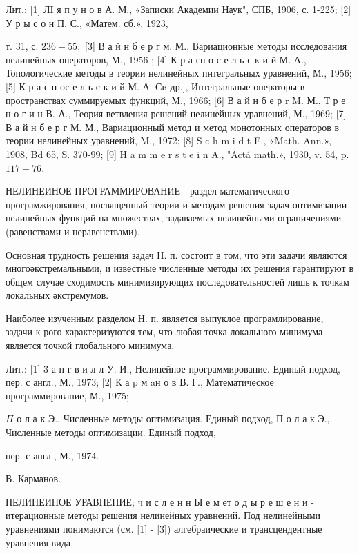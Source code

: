 \documentclass[10pt]{article}
\begin{document}
Лит.: [1] ЛI я п у н о в А. М., «Записки Академии Наук", СПБ, 1906, с. 1-225; [2] У р ы с о н П. С., «Матем. сб.», 1923,

т. 31, с. $236-55 ;$ [3] В а й н б е р г м. М., Вариационные методы исследования нелинейных операторов, М., 1956 ; [4] К р а сн о с е л ь с к и й М. А., Топологические методы в теории нелинейных пнтегральных уравнений, М., 1956; [5] К р а с н ос е л ь с к и й М. А. Си др.], Интегральные операторы в пространствах суммируемых функций, М., 1966; [6] В а й н б е р r M. М., Т р е н о г и н В. А., Теория ветвления решений нелинейных уравнений, М., 1969; [7] В а й н б е р г М. М., Вариационный метод и метод монотонных операторов в теории нелинейных уравнений, M., 1972; [8] S c h m i d t E., «Math. Ann.», 1908, Bd 65, S. 370-99; [9] H a m m e r s t e i n A., "Actá math.», 1930, v. 54, p. $117-76$.



НЕЛИНЕИНОЕ ПРОГРАММИРОВАНИЕ - раздел математического програмжирования, посвященный теории и методам решения задач оптимизации нелинейных функций на множествах, задаваемых нелинейными ограничениями (равенствами и неравенствами).



Основная трудность решения задач Н. п. состоит в том, что эти задачи являются многоәкстремальными, и известные численные методы их решения гарантируют в общем случае сходимость минимизирующих последовательностей лишь к точкам локальных әкстремумов.



Наиболее изученным разделом Н. п. является выпуклое програмлирование, задачи к-рого характеризуются тем, что любая точка локального минимума является точкой глобального минимума.



Лит.: [1] 3 а н г в и л л У. И., Нелинейное программирование. Единый подход, пер. с англ., М., 1973; [2] К а p м aн о в В. Г., Математическое программирование, М., 1975;

$\Pi$ о л а к Э., Численные методы оптимизация. Единый подход, П о л а к Э., Численные методы оптимизации. Единый подход,

пер. с англ., М., 1974.

В. Карманов.



НЕЛИНЕИНОЕ УРАВНЕНИЕ; ч и с л е н н Ы е м ет о д ы р е ш е н и - итерационные методы решения нелинейных уравнений. Под нелинейными уравнениями понимаются (см. [1] - [3]) алгебраические и трансцендентные уравнения вида
\end{document}
